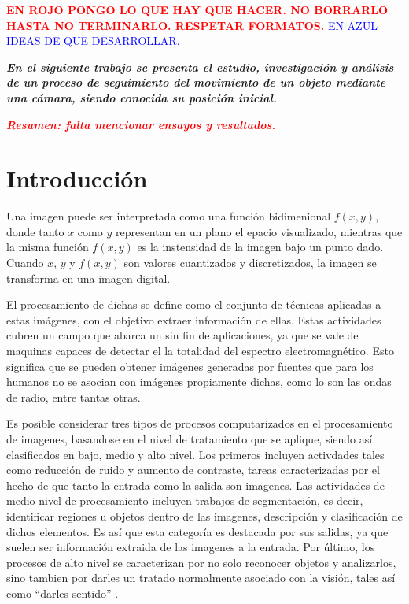 








\begin{center}
	\Large{\textcolor{red}{\textbf{EN ROJO PONGO LO QUE HAY QUE HACER. NO BORRARLO HASTA NO TERMINARLO. RESPETAR FORMATOS.}} \textcolor{blue}{EN AZUL IDEAS DE QUE DESARROLLAR.}}
\end{center}

\textbf{\textit{En el siguiente trabajo se presenta el estudio, investigación y análisis de un proceso de seguimiento del movimiento de un objeto mediante una cámara, siendo conocida su posición inicial.}}

\textcolor{red}{\textbf{\textit{Resumen: falta mencionar ensayos y resultados.}}}

\section{Introducción}
Una imagen puede ser interpretada como una función bidimenional $f\left( x, y\right)$, donde tanto $x$ como $y$ representan en un plano el epacio visualizado, mientras que la misma función $f\left( x, y\right)$ es la instensidad de la imagen bajo un punto dado. Cuando $x$, $y$ y $f\left( x, y\right)$ son valores cuantizados y discretizados, la imagen se transforma en una imagen digital.
	 	
El procesamiento de dichas se define como el conjunto de técnicas aplicadas a estas imágenes, con el objetivo extraer información de ellas. Estas actividades cubren un campo que abarca un sin fin de aplicaciones, ya que se vale de maquinas capaces de detectar el la totalidad del espectro electromagnético. Esto significa que se pueden obtener imágenes generadas por fuentes que para los humanos no se asocian con imágenes propiamente dichas, como lo son las ondas de radio, entre tantas otras.
	
Es posible considerar tres tipos de procesos computarizados en el procesamiento de imagenes, basandose en el nivel de tratamiento que se aplique, siendo así clasificados en bajo, medio y alto nivel. Los primeros incluyen activdades tales como reducción de ruido y aumento de contraste, tareas caracterizadas por el hecho de que tanto la entrada como la salida son imagenes. Las actividades de medio nivel de procesamiento incluyen trabajos de segmentación, es decir, identificar regiones u objetos dentro de las imagenes, descripción y clasificación de dichos elementos. Es así que esta categoría es destacada por sus salidas, ya que suelen ser información extraida de las imagenes a la entrada. Por último, los procesos de alto nivel se caracterizan por no solo reconocer objetos y analizarlos, sino tambien por darles un tratado normalmente asociado con la visión, tales así como ``darles sentido'' \cite{ref:intro1}.
	
